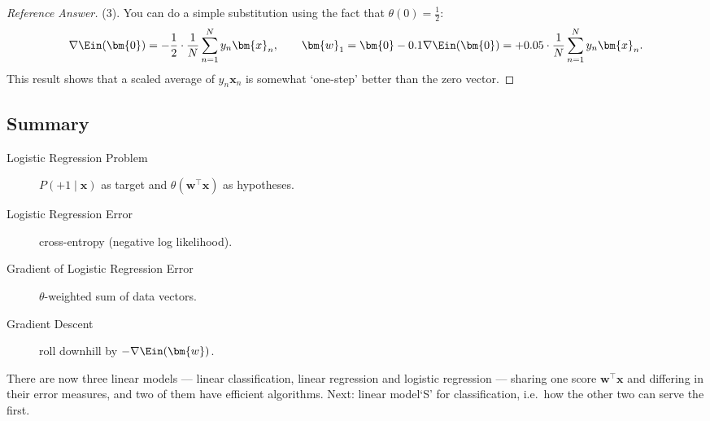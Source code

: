 \begin{proof}[Reference Answer]
    (3). You can do a simple substitution using the fact that \(\theta(0) =
    \frac{1}{2}\):
    \[
        \nabla \Ein(\bm{0}) = -\frac{1}{2} \cdot \frac{1}{N} \sum_{n=1}^N y_n
        \bm{x}_n ,
        \qquad
        \bm{w}_1 = \bm{0} - 0.1 \nabla \Ein(\bm{0}) = +0.05 \cdot \frac{1}{N}
        \sum_{n=1}^N y_n \bm{x}_n .
    \]
    This result shows that a
    scaled average of \(y_n \bm{x}_n\) is somewhat `one-step' better than the
    zero vector.
\end{proof}

\hrulebar

\subsection*{Summary}

\begin{description}
    \item[Logistic Regression Problem] \(P(+1 \mid \bm{x})\) as target and
        \(\theta(\bm{w}^\top \bm{x})\) as hypotheses.
    \item[Logistic Regression Error] cross-entropy (negative log likelihood).
    \item[Gradient of Logistic Regression Error] \(\theta\)-weighted sum of
        data vectors.
    \item[Gradient Descent] roll downhill by \(-\nabla \Ein(\bm{w})\).
\end{description}

There are now three linear models --- linear classification, linear
regression and logistic regression --- sharing one score \(\bm{w}^\top
\bm{x}\) and differing in their error measures, and two of them have efficient
algorithms. Next: linear model`S' for classification, i.e.\ how the other two
can serve the first.
